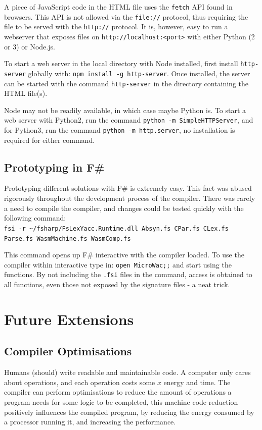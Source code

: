 \documentclass[a4paper]{article}
\begin{document}
A piece of JavaScript code in the HTML file uses the \texttt{fetch} API found in browsers. This API is not allowed via the \texttt{file://} protocol, thus requiring the file to be served with the \texttt{http://} protocol. It is, however, easy to run a webserver that exposes files on \texttt{http://localhost:<port>} with either Python (2 or 3) or Node.js.

To start a web server in the local directory with Node installed, first install \texttt{http-server} globally with: \verb$npm install -g http-server$. Once installed, the server can be started with the command \texttt{http-server} in the directory containing the HTML file(s).

Node may not be readily available, in which case maybe Python is. To start a web server with Python2, run the command \texttt{python -m SimpleHTTPServer}, and for Python3, run the command \texttt{python -m http.server}, no installation is required for either command.

\subsection{Prototyping in F\#}
\label{sec:peripherals:prototyping}
Prototyping different solutions with F\# is extremely easy. This fact was abused rigorously throughout the development process of the compiler. There was rarely a need to compile the compiler, and changes could be tested quickly with the following command:\\
\texttt{fsi -r \textasciitilde/fsharp/FsLexYacc.Runtime.dll Absyn.fs CPar.fs CLex.fs Parse.fs WasmMachine.fs WasmComp.fs}

This command opens up F\# interactive with the compiler loaded. To use the compiler within interactive type in: \texttt{open MicroWac;;} and start using the functions. By not including the \texttt{.fsi} files in the command, access is obtained to all functions, even those not exposed by the signature files - a neat trick.

\section{Future Extensions}
\label{sec:extensions}

\subsection{Compiler Optimisations}
\label{sec:extensions:optimisations}
Humans (should) write readable and maintainable code. A computer only cares about operations, and each operation costs some $x$ energy and time. The compiler can perform optimisations to reduce the amount of operations a program needs for some logic to be completed, this machine code reduction positively influences the compiled program, by reducing the energy consumed by a processor running it, and increasing the performance.
\end{document}
